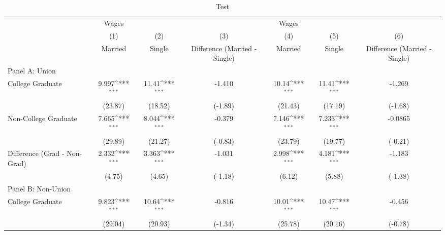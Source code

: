 \begin{table}[htbp]\centering
\def\sym#1{\ifmmode^{#1}\else\(^{#1}\)\fi}
\caption{Test}
\begin{tabular}{l*{6}{c}}
\hline\hline
            &       Wages         &                     &                     &       Wages         &                     &                     \\
            &\multicolumn{1}{c}{(1)}&\multicolumn{1}{c}{(2)}&\multicolumn{1}{c}{(3)}&\multicolumn{1}{c}{(4)}&\multicolumn{1}{c}{(5)}&\multicolumn{1}{c}{(6)}\\
            &\multicolumn{1}{c}{Married}&\multicolumn{1}{c}{Single}&\multicolumn{1}{c}{Difference (Married - Single)}&\multicolumn{1}{c}{Married}&\multicolumn{1}{c}{Single}&\multicolumn{1}{c}{Difference (Married - Single)}\\
\hline
Panel A: Union&                     &                     &                     &                     &                     &                     \\
College Graduate&       9.997\sym{***}&       11.41\sym{***}&      -1.410         &       10.14\sym{***}&       11.41\sym{***}&      -1.269         \\
            &     (23.87)         &     (18.52)         &     (-1.89)         &     (21.43)         &     (17.19)         &     (-1.68)         \\
Non-College Graduate&       7.665\sym{***}&       8.044\sym{***}&      -0.379         &       7.146\sym{***}&       7.233\sym{***}&     -0.0865         \\
            &     (29.89)         &     (21.27)         &     (-0.83)         &     (23.79)         &     (19.77)         &     (-0.21)         \\
Difference (Grad - Non-Grad)&       2.332\sym{***}&       3.363\sym{***}&      -1.031         &       2.998\sym{***}&       4.181\sym{***}&      -1.183         \\
            &      (4.75)         &      (4.65)         &     (-1.18)         &      (6.12)         &      (5.88)         &     (-1.38)         \\
\hline
Panel B: Non-Union&                     &                     &                     &                     &                     &                     \\
College Graduate&       9.823\sym{***}&       10.64\sym{***}&      -0.816         &       10.01\sym{***}&       10.47\sym{***}&      -0.456         \\
            &     (29.04)         &     (20.93)         &     (-1.34)         &     (25.78)         &     (20.16)         &     (-0.78)         \\

\end{tabular}
\end{table}

